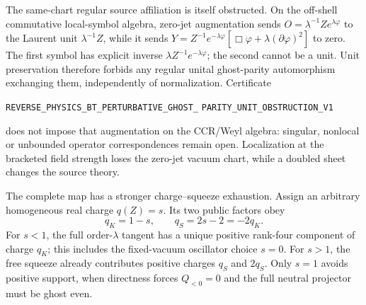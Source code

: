 \documentclass[11pt]{article}
\theoremstyle{definition}
\theoremstyle{remark}
\begin{document}
The same-chart regular source affiliation is itself obstructed.  On the
off-shell commutative local-symbol algebra, zero-jet augmentation sends
$O=\lambda^{-1}Ze^{\lambda\varphi}$ to the Laurent unit
$\lambda^{-1}Z$, while it sends
$Y=Z^{-1}e^{-\lambda\varphi}
[\Box\varphi+\lambda(\partial\varphi)^2]$ to zero.  The first symbol has
explicit inverse $\lambda Z^{-1}e^{-\lambda\varphi}$; the second cannot be a
unit.  Unit preservation therefore forbids any regular unital ghost-parity
automorphism exchanging them, independently of normalization.  Certificate
\par\noindent
\texttt{REVERSE\_PHYSICS\_BT\_PERTURBATIVE\_GHOST\_}
\allowbreak\texttt{PARITY\_UNIT\_OBSTRUCTION\_V1}
\par\noindent
does not impose that augmentation on the CCR/Weyl algebra: singular,
nonlocal or unbounded operator correspondences remain open.  Localization
at the bracketed field strength loses the zero-jet vacuum chart, while a
doubled sheet changes the source theory.

The complete map has a stronger charge--squeeze exhaustion.  Assign an
arbitrary homogeneous real charge $q(Z)=s$.  Its two public factors obey
\[
 q_K=1-s,\qquad q_S=2s-2=-2q_K.
\]
For $s<1$, the full order-$\lambda$ tangent has a unique positive rank-four
component of charge $q_K$; this includes the fixed-vacuum oscillator choice
$s=0$.  For $s>1$, the free squeeze already contributes positive charges
$q_S$ and $2q_S$.  Only $s=1$ avoids positive support, when directness forces
$Q_{<0}=0$ and the full neutral projector must be ghost even.
\end{document}
